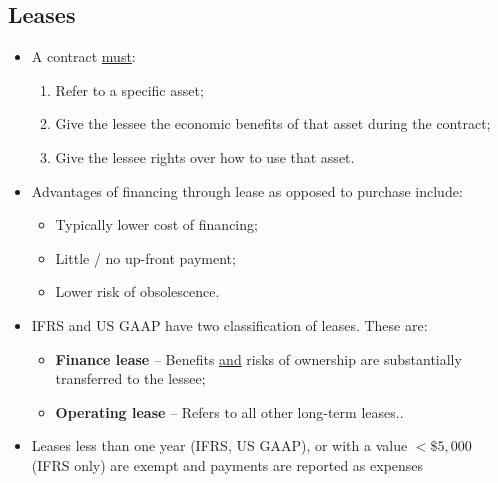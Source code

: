 \documentclass[../notes_compiled.tex]{subfiles}
\begin{document}
\subsection{Leases}
\begin{itemize}
\item A contract \underline{must}:
\begin{enumerate}
\item Refer to a specific asset;
\item Give the lessee the economic benefits of that asset during the contract;
\item Give the lessee rights over how to use that asset.
\end{enumerate}
\item Advantages of financing through lease as opposed to purchase include:
\begin{itemize}
\item Typically lower cost of financing;
\item Little / no up-front payment;
\item Lower risk of obsolescence.
\end{itemize}
\item IFRS and US GAAP have two classification of leases. These are:
\begin{itemize} 
\item \textbf{Finance lease} -- Benefits \underline{and} risks of ownership are substantially transferred to the lessee;
\item \textbf{Operating lease} -- Refers to all other long-term leases..
\end{itemize}
\item Leases less than one year (IFRS, US GAAP), or with a value $<\$5,000$ (IFRS only) are exempt and payments are reported as expenses
\end{itemize}
\end{document}

